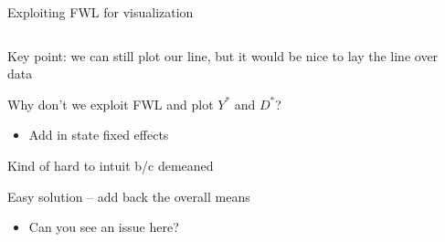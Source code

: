 \documentclass[notes,11pt, aspectratio=169]{beamer}
\newcommand\1{\operatorname{\mathbbm{1}}\indicatorfence}
\newenvironment{wideitemize}{\itemize\addtolength{\itemsep}{10pt}}{\enditemize}
\begin{document}
\begin{frame}{Exploiting FWL for visualization}
  \begin{columns}[T] %
    \begin{column}{.5\textwidth}
  \begin{wideitemize}
  \item<1-> Key point: we can still plot our line, but it would be nice to
    lay the line over data
  \item<1-> Why don't we exploit FWL and plot $Y^{*}$ and  $D^{*}$?
    \begin{itemize}
    \item Add in state fixed effects
    \end{itemize}
  \item<1-> Kind of hard to intuit b/c demeaned
  \item<2-> Easy solution -- add back the overall means
    \begin{itemize}
    \item Can you see an issue here?
    \end{itemize}
  \end{wideitemize}
  \end{column}%
  \hfill%
  \begin{column}{.5\textwidth}
\end{column}
\end{columns}
\end{frame}
\end{document}
